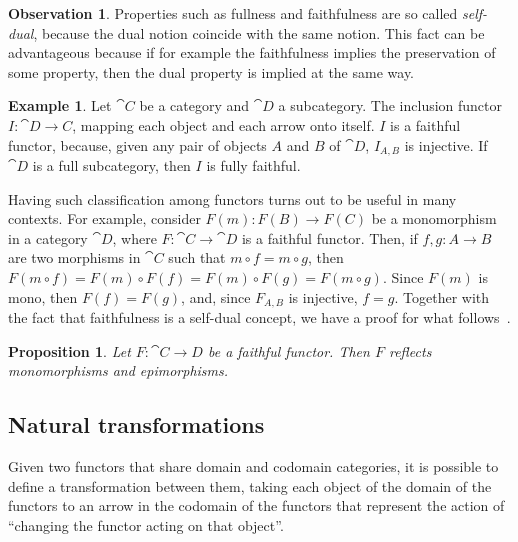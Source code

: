\documentclass[a4paper, twoside,openright]{report}
\theoremstyle{plain}
\newtheorem{prop}[theorem]{Proposition}
\theoremstyle{definition}
\newtheorem{example}[theorem]{Example}
\newtheorem{obs}[theorem]{Observation}
\begin{document}
\begin{obs}
    Properties such as fullness and faithfulness are so called \emph{self-dual}, because the dual notion coincide with the same notion. This fact can be advantageous because if for example the faithfulness implies the preservation of some property, then the dual property is implied at the same way.
\end{obs}

\begin{example}
    Let $\cat C$ be a category and $\cat D$ a subcategory. The inclusion functor $I: \cat{D \rightarrow C}$, mapping each object and each arrow onto itself. $I$ is a faithful functor, because, given any pair of objects $A$ and $B$ of $\cat D$, $I_{A, B}$ is injective. If $\cat D$ is a full subcategory, then $I$ is fully faithful.
\end{example}

Having such classification among functors turns out to be useful in many contexts. For example, consider $F(m): F(B) \rightarrow F(C)$ be a monomorphism in a category $\cat D$, where $F: \cat C \rightarrow \cat D$ is a faithful functor. Then, if $f, g: A \rightarrow B$ are two morphisms in $\cat C$ such that $m \circ f = m \circ g$, then $F(m \circ f) = F(m) \circ F(f) = F(m) \circ F(g) = F(m\circ g)$. Since $F(m)$ is mono, then $F(f) = F(g)$, and, since $F_{A, B}$ is injective, $f = g$. Together with the fact that faithfulness is a self-dual concept, we have a proof for what follows~\cite{Herrlich_Strecker_1979}.

\begin{prop}
    Let $F: \cat{C \rightarrow D}$ be a faithful functor. Then $F$ reflects monomorphisms and epimorphisms.
\end{prop}


\subsection{Natural transformations}

Given two functors that share domain and codomain categories, it is possible to define a transformation between them, taking each object of the domain of the functors to an arrow in the codomain of the functors that represent the action of ``changing the functor acting on that object''.
\end{document}

